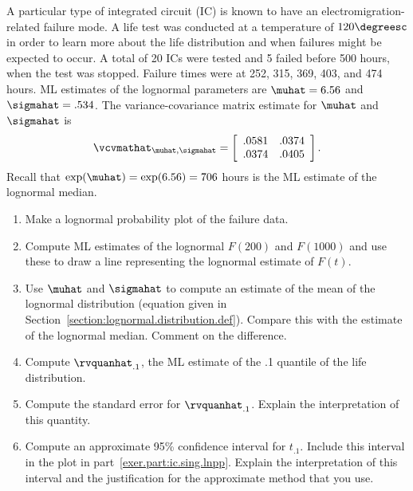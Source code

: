 \begin{exercise}
\label{exercise:ic.sing.alt}
A particular type of integrated circuit (IC) is known to have an
electromigration-related failure mode. A life test was conducted at
a temperature of $120\degreesc$ in order to learn more about the life
distribution and when failures might be expected to occur. A total
of 20 ICs were tested and 5 failed before 500 hours, when the test
was stopped. Failure times were at 252, 315, 369, 403, and 474
hours. ML estimates of the lognormal parameters are $\muhat=6.56$
and $\sigmahat=.534$. The variance-covariance matrix estimate for
$\muhat$ and $\sigmahat$ is
\begin{displaymath}
\vcvmathat_{\muhat,\sigmahat}=
\left[ 
\begin{array}{rr}
.0581 &.0374\\
.0374 & .0405
\end{array}
\right].
\end{displaymath}
Recall that $\exp(\muhat)=\exp(6.56)=706$ hours  is the ML estimate of
the lognormal median.
\begin{enumerate}
\item
\label{exer.part:ic.sing.lnpp}
Make a lognormal probability plot of the failure data.
\item
Compute ML estimates of the lognormal $F(200)$ and $F(1000)$ and use
these to draw a line representing the lognormal estimate of
$F(t)$.
\item
Use $\muhat$ and $\sigmahat$ to compute an estimate of the mean of
the lognormal distribution (equation given in
Section~\ref{section:lognormal.distribution.def}).  Compare this
with the estimate of the lognormal median. Comment on the
difference.
\item
Compute $\rvquanhat_{.1}$, the ML estimate of 
the .1 quantile of the life distribution.
\item
Compute the standard error for $\rvquanhat_{.1}$. Explain the
interpretation
of this quantity.
\item
Compute an approximate 95\% confidence interval for $t_{.1}$.  
Include this interval in the plot in
part~\ref{exer.part:ic.sing.lnpp}.
Explain
the interpretation of this interval and the justification for the
approximate method that you use.
\end{enumerate}
\end{exercise}

